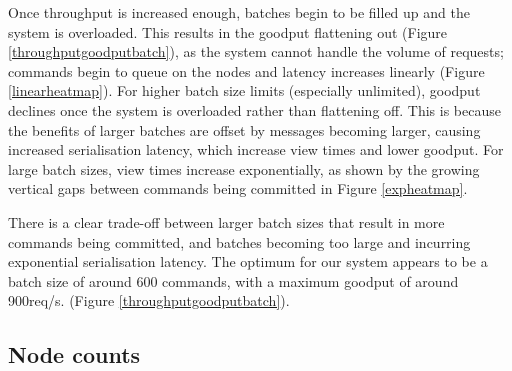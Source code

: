 Once throughput is increased enough, batches begin to be filled up and the system is overloaded. This results in the goodput flattening out (Figure \ref{throughputgoodputbatch}), as the system cannot handle the volume of requests; commands begin to queue on the nodes and latency increases linearly (Figure \ref{linearheatmap}). For higher batch size limits (especially unlimited), goodput declines once the system is overloaded rather than flattening off. This is because the benefits of larger batches are offset by messages becoming larger, causing increased serialisation latency, which increase view times and lower goodput. For large batch sizes, view times increase exponentially, as shown by the growing vertical gaps between commands being committed in Figure \ref{expheatmap}.

There is a clear trade-off between larger batch sizes that result in more commands being committed, and batches becoming too large and incurring exponential serialisation latency. The optimum for our system appears to be a batch size of around 600 commands, with a maximum goodput of around 900req/s. (Figure \ref{throughputgoodputbatch}).



\subsection{Node counts} \label{nodecountseval}

